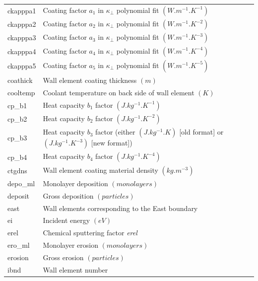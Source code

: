 \documentclass[a4paper,10pt]{report}
\begin{document}
\begin{center}
\begin{longtable}{|l|l|}
    ckapppa1 \index{b2plot, ckapppa1}  & Coating factor $a_1$ in $\kappa_\perp$ polynomial fit $(W.m^{-1}.K^{-1})$ \\
    ckapppa2 \index{b2plot, ckapppa2}  & Coating factor $a_2$ in $\kappa_\perp$ polynomial fit $(W.m^{-1}.K^{-2})$ \\
    ckapppa3 \index{b2plot, ckapppa3}  & Coating factor $a_3$ in $\kappa_\perp$ polynomial fit $(W.m^{-1}.K^{-3})$ \\
    ckapppa4 \index{b2plot, ckapppa4}  & Coating factor $a_4$ in $\kappa_\perp$ polynomial fit $(W.m^{-1}.K^{-4})$ \\
    ckapppa5 \index{b2plot, ckapppa5}  & Coating factor $a_5$ in $\kappa_\perp$ polynomial fit $(W.m^{-1}.K^{-5})$ \\
    coathick \index{b2plot, coathick}  & Wall element coating thickness $(m)$ \\
    cooltemp \index{b2plot, cooltemp}  & Coolant temperature on back side of wall element $(K)$ \\
    cp\_b1 \index{b2plot, cp\_b1}    & Heat capacity $b_1$ factor $(J.kg^{-1}.K^{-1})$ \\
    cp\_b2 \index{b2plot, cp\_b2}    & Heat capacity $b_2$ factor $(J.kg^{-1}.K^{-2})$ \\
    cp\_b3 \index{b2plot, cp\_b3}    & Heat capacity $b_3$ factor (either $(J.kg^{-1}.K)$ [old format] or $(J.kg^{-1}.K^{-3})$ [new format]) \\
    cp\_b4 \index{b2plot, cp\_b4}    & Heat capacity $b_4$ factor $(J.kg^{-1}.K^{-4})$ \\
    ctgdns \index{b2plot, ctgdns}    & Wall element coating material density $(kg.m^{-3})$ \\
    depo\_ml \index{b2plot, depo\_ml}  & Monolayer deposition $(monolayers)$ \\
    deposit \index{b2plot, deposit} & Gross deposition $(particles)$ \\
    east \index{b2plot, east}       & Wall elements corresponding to the East boundary \\
    ei \index{b2plot, ei}           & Incident energy $(eV)$ \\
    erel \index{b2plot, erel}       & Chemical sputtering factor {\em erel} \\
    ero\_ml \index{b2plot, ero\_ml} & Monolayer erosion $(monolayers)$ \\
    erosion \index{b2plot, erosion} & Gross erosion $(particles)$ \\
    ibnd \index{b2plot, ibnd}       & Wall element number \\

\end{longtable}
\end{center}
\end{document}

